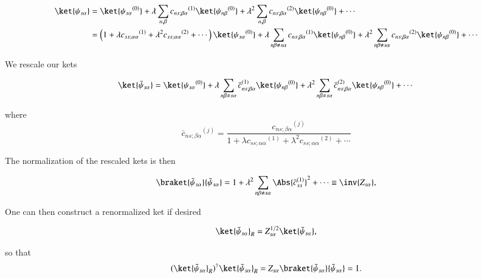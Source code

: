 \begin{equation}\label{eqn:qmTwoL5a:170}
\begin{aligned}
\ket{\psi_{s \alpha}} 
&= 
\ket{{\psi_{s \alpha}}^{(0)}} 
+
\lambda
\sum_{n, \beta} {c_{ns;\beta \alpha}}^{(1)} \ket{{\psi_{n \beta}}^{(0)}} 
+ 
\lambda^2
\sum_{n, \beta} {c_{ns;\beta \alpha}}^{(2)} \ket{{\psi_{n \beta}}^{(0)}} 
+ \cdots \\
&=
\left(
1 
+ \lambda {c_{ss ; \alpha \alpha}}^{(1)} 
+ \lambda^2 {c_{ss ; \alpha \alpha}}^{(2)} 
+ \cdots
\right)
\ket{{\psi_{s \alpha}}^{(0)}} 
+ 
\lambda
\sum_{n\beta \ne s\alpha} {c_{ns;\beta \alpha}}^{(1)} \ket{{\psi_{n \beta}}^{(0)}} 
+
\lambda^2
\sum_{n\beta \ne s\alpha} {c_{ns;\beta \alpha}}^{(2)} \ket{{\psi_{n \beta}}^{(0)}} 
+ \cdots
\end{aligned}
\end{equation}

We rescale our kets 

\begin{equation}\label{eqn:qmTwoL5a:190}
\ket{\bar{\psi}_{s \alpha}} 
=
\ket{{\psi_{s \alpha}}^{(0)}} 
+ 
\lambda
\sum_{n\beta \ne s\alpha} {\bar{c}_{ns;\beta \alpha}}^{(1)} \ket{{\psi_{n \beta}}^{(0)}} 
+
\lambda^2
\sum_{n\beta \ne s\alpha} {\bar{c}_{ns;\beta \alpha}}^{(2)} \ket{{\psi_{n \beta}}^{(0)}} 
+ \cdots
\end{equation}

where
\begin{equation}\label{eqn:qmTwoL5a:210}
{\bar{c}_{ns;\beta \alpha}}^{(j)} = 
\frac{{c_{ns;\beta \alpha}}^{(j)}}
{
1 
+ \lambda {c_{ss ; \alpha \alpha}}^{(1)} 
+ \lambda^2 {c_{ss ; \alpha \alpha}}^{(2)} 
+ \cdots
}
\end{equation}

The normalization of the rescaled kets is then

\begin{equation}\label{eqn:qmTwoL5a:230}
\braket{\bar{\psi}_{s \alpha}}{\bar{\psi}_{s \alpha}} 
=
1
+ 
\lambda^2
\sum_{n\beta \ne s\alpha} \Abs{{\bar{c}_{ss}}^{(1)}}^2
+
\cdots
\equiv \inv{Z_{s \alpha}},
\end{equation}

One can then construct a renormalized ket if desired

\begin{equation}\label{eqn:qmTwoL5a:250}
\ket{\bar{\psi}_{s \alpha}}_R = Z_{s \alpha}^{1/2} \ket{\bar{\psi}_{s \alpha}},
\end{equation}

so that
\begin{equation}\label{eqn:qmTwoL5a:270}
(\ket{\bar{\psi}_{s \alpha}}_R)^\dagger \ket{\bar{\psi}_{s \alpha}}_R = Z_{s \alpha} \braket{\bar{\psi}_{s \alpha}}{\bar{\psi}_{s \alpha}} = 1.
\end{equation}

